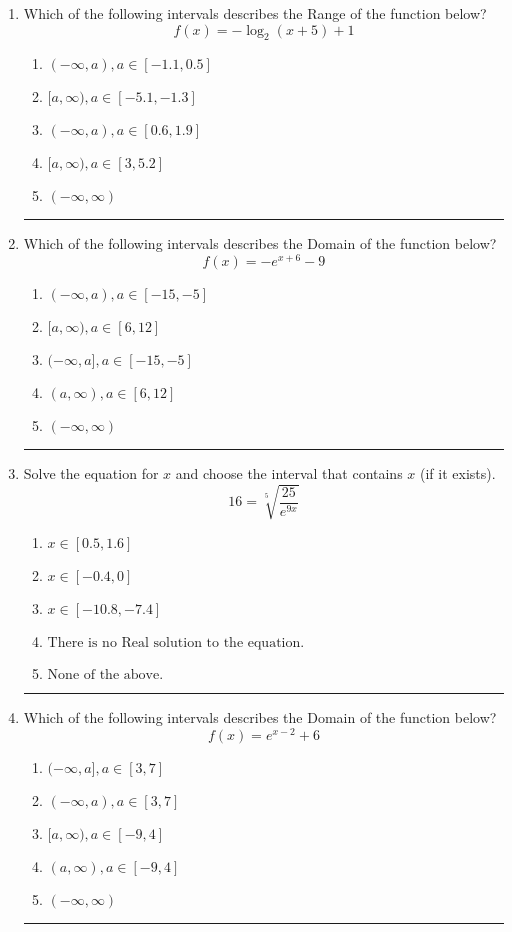 \documentclass[14pt]{extbook}
\newcommand{\litem}[1]{\item#1\hspace*{-1cm}\rule{\textwidth}{0.4pt}}
\begin{document}
\begin{enumerate}
{\begin{enumerate}[label=\Alph*.]
\end{enumerate} }
\litem{
Which of the following intervals describes the Range of the function below?\[ f(x) = -\log_2{(x+5)}+1 \]\begin{enumerate}[label=\Alph*.]
\item \( (-\infty, a), a \in [-1.1, 0.5] \)
\item \( [a, \infty), a \in [-5.1, -1.3] \)
\item \( (-\infty, a), a \in [0.6, 1.9] \)
\item \( [a, \infty), a \in [3, 5.2] \)
\item \( (-\infty, \infty) \)

\end{enumerate} }
\litem{
Which of the following intervals describes the Domain of the function below?\[ f(x) = -e^{x+6}-9 \]\begin{enumerate}[label=\Alph*.]
\item \( (-\infty, a), a \in [-15, -5] \)
\item \( [a, \infty), a \in [6, 12] \)
\item \( (-\infty, a], a \in [-15, -5] \)
\item \( (a, \infty), a \in [6, 12] \)
\item \( (-\infty, \infty) \)

\end{enumerate} }
\litem{
 Solve the equation for $x$ and choose the interval that contains $x$ (if it exists).\[  16 = \sqrt[5]{\frac{25}{e^{9x}}} \]\begin{enumerate}[label=\Alph*.]
\item \( x \in [0.5, 1.6] \)
\item \( x \in [-0.4, 0] \)
\item \( x \in [-10.8, -7.4] \)
\item \( \text{There is no Real solution to the equation.} \)
\item \( \text{None of the above.} \)

\end{enumerate} }
\litem{
Which of the following intervals describes the Domain of the function below?\[ f(x) = e^{x-2}+6 \]\begin{enumerate}[label=\Alph*.]
\item \( (-\infty, a], a \in [3, 7] \)
\item \( (-\infty, a), a \in [3, 7] \)
\item \( [a, \infty), a \in [-9, 4] \)
\item \( (a, \infty), a \in [-9, 4] \)
\item \( (-\infty, \infty) \)


\end{enumerate}}
\end{enumerate}
\end{document}
